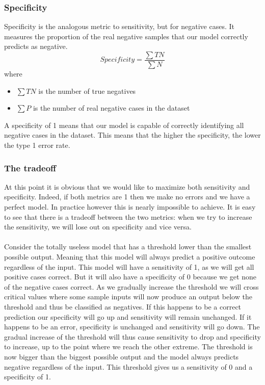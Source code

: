\subsubsection{Specificity}
Specificity\cite{wikisensspec} is the analogous metric to sensitivity, but for negative cases. It measures the proportion of the real negative samples that our model correctly predicts as negative.
$$
Specificity = \frac{\sum{TN}}{\sum{N}}
$$
where
\begin{itemize}
\item $\sum{TN}$ is the number of true negatives
\item $\sum{P}$ is the number of real negative cases in the dataset
\end{itemize}
A specificity of 1 means that our model is capable of correctly identifying all negative cases in the dataset. This means that the higher the specificity, the lower the type 1 error rate.
\subsubsection{The tradeoff}
At this point it is obvious that we would like to maximize both sensitivity and specificity. Indeed, if both metrics are 1 then we make no errors and we have a perfect model. In practice however this is nearly impossible to achieve. It is easy to see that there is a tradeoff between the two metrics: when we try to increase the sensitivity, we will lose out on specificity and vice versa. \\ \\ 
Consider the totally useless model that has a threshold lower than the smallest possible output. Meaning that this model will always predict a positive outcome regardless of the input. This model will have a sensitivity of 1, as we will get all positive cases correct. But it will also have a specificity of 0 because we get none of the negative cases correct. As we gradually increase the threshold we will cross critical values where some sample inputs will now produce an output below the threshold and thus be classified as negatives. If this happens to be a correct prediction our specificity will go up and sensitivity will remain unchanged. If it happens to be an error, specificity is unchanged and sensitivity will go down. The gradual increase of the threshold will thus cause sensitivity to drop and specificity to increase, up to the point where we reach the other extreme. The threshold is now bigger than the biggest possible output and the model always predicts negative regardless of the input. This threshold gives us a sensitivity of 0 and a specificity of 1.
